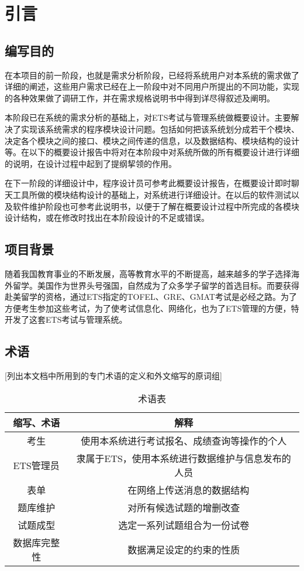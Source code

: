 \chapter{引言}
\section{编写目的}
在本项目的前一阶段，也就是需求分析阶段，已经将系统用户对本系统的需求做了详细的阐述，这些用户需求已经在上一阶段中对不同用户所提出的不同功能，实现的各种效果做了调研工作，并在需求规格说明书中得到详尽得叙述及阐明。

本阶段已在系统的需求分析的基础上，对ETS考试与管理系统做概要设计。主要解决了实现该系统需求的程序模块设计问题。包括如何把该系统划分成若干个模块、决定各个模块之间的接口、模块之间传递的信息，以及数据结构、模块结构的设计等。在以下的概要设计报告中将对在本阶段中对系统所做的所有概要设计进行详细的说明，在设计过程中起到了提纲挈领的作用。

在下一阶段的详细设计中，程序设计员可参考此概要设计报告，在概要设计即时聊天工具所做的模块结构设计的基础上，对系统进行详细设计。在以后的软件测试以及软件维护阶段也可参考此说明书，以便于了解在概要设计过程中所完成的各模块设计结构，或在修改时找出在本阶段设计的不足或错误。


\section{项目背景}
随着我国教育事业的不断发展，高等教育水平的不断提高，越来越多的学子选择海外留学。美国作为世界头号强国，自然成为了众多学子留学的首选目标。而要获得赴美留学的资格，通过ETS指定的TOFEL、GRE、GMAT考试是必经之路。为了方便考生参加这些考试，为了使考试信息化、网络化，也为了ETS管理的方便，特开发了这套ETS考试与管理系统。

\section{术语}
[列出本文档中所用到的专门术语的定义和外文缩写的原词组]
\begin{table}[htbp]
\centering
\caption{术语表} \label{tab:terminology}
\begin{tabular}{|c|c|}
    \hline
    缩写、术语 & 解释 \\
    \hline
    考生 & 使用本系统进行考试报名、成绩查询等操作的个人 \\
    \hline
    ETS管理员 & 隶属于ETS，使用本系统进行数据维护与信息发布的人员 \\
    \hline
    表单 &　在网络上传送消息的数据结构 \\
    \hline
    题库维护 & 对所有候选试题的增删改查 \\
    \hline
    试题成型 & 选定一系列试题组合为一份试卷 \\
    \hline
    数据库完整性 & 数据满足设定的约束的性质 \\
    \hline
\end{tabular}
\end{table}